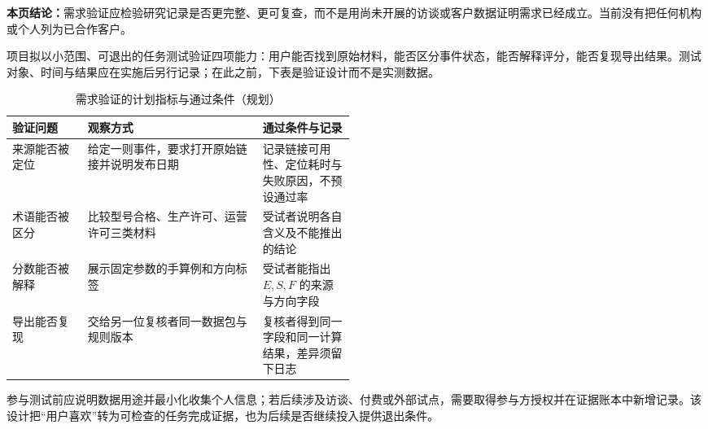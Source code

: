 
\textbf{本页结论：}需求验证应检验研究记录是否更完整、更可复查，而不是用尚未开展的访谈或客户数据证明需求已经成立。当前没有把任何机构或个人列为已合作客户。

项目拟以小范围、可退出的任务测试验证四项能力：用户能否找到原始材料，能否区分事件状态，能否解释评分，能否复现导出结果。测试对象、时间与结果应在实施后另行记录；在此之前，下表是验证设计而不是实测数据。

\begin{table}[htbp]
\centering
\caption{需求验证的计划指标与通过条件（规划）}
\label{tab:wty-validation-plan}
\small
\begin{tabularx}{\linewidth}{p{0.22\linewidth}X p{0.27\linewidth}}
\toprule
验证问题 & 观察方式 & 通过条件与记录 \\
\midrule
来源能否被定位 & 给定一则事件，要求打开原始链接并说明发布日期 & 记录链接可用性、定位耗时与失败原因，不预设通过率 \\
术语能否被区分 & 比较型号合格、生产许可、运营许可三类材料 & 受试者说明各自含义及不能推出的结论 \\
分数能否被解释 & 展示固定参数的手算例和方向标签 & 受试者能指出 $E,S,F$ 的来源与方向字段 \\
导出能否复现 & 交给另一位复核者同一数据包与规则版本 & 复核者得到同一字段和同一计算结果，差异须留下日志 \\
\bottomrule
\end{tabularx}
\end{table}

参与测试前应说明数据用途并最小化收集个人信息；若后续涉及访谈、付费或外部试点，需要取得参与方授权并在证据账本中新增记录。该设计把“用户喜欢”转为可检查的任务完成证据，也为后续是否继续投入提供退出条件。
